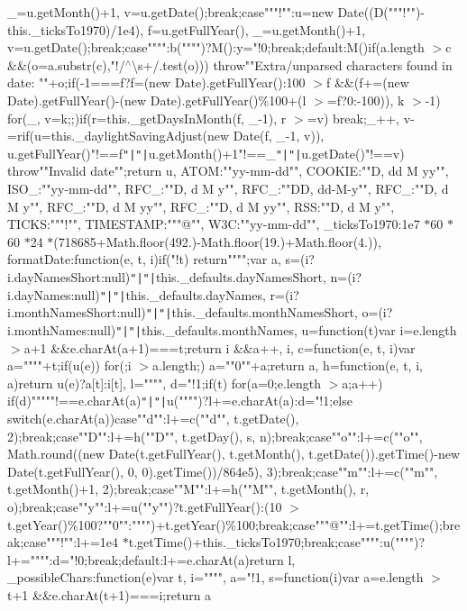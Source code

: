 \+\_\+=u.\+get\+Month()+1, v=u.\+get\+Date();break;case"""!""\+:u=new Date((\+D("""!"")-\/this.\+\_\+ticks\+To1970)/1e4), f=u.\+get\+Full\+Year(), \+\_\+=u.\+get\+Month()+1, v=u.\+get\+Date();break;case""\textquotesingle{}""\+:b(""\textquotesingle{}"")?\+M()\+:y="!0;break;default\+:\+M()\rcurly{}if(a.\+length $>$c \&\&(o=a.\+substr(c),"!/$^\wedge$\textbackslash{}s+/.\+test(o))) throw""Extra/unparsed characters found in date\+: ""+o;if(-\/1===f?f=(new Date).\+get\+Full\+Year()\+:100 $>$f \&\&(f+=(new Date).\+get\+Full\+Year()-\/(new Date).\+get\+Full\+Year()\%100+(l $>$=f?0\+:-\/100)), k $>$-\/1) for(\+\_, v=k;;)\lcurly{}if(r=this.\+\_\+get\+Days\+In\+Month(f, \+\_\+-\/1), r $>$=v) break;\+\_\+++, v-\/=r\rcurly{}if(u=this.\+\_\+daylight\+Saving\+Adjust(new Date(f, \+\_\+-\/1, v)), u.\+get\+Full\+Year()"!==f\texttt{"|}\texttt{"|}u.\+get\+Month()+1"!==\+\_\+\texttt{"|}\texttt{"|}u.\+get\+Date()"!==v) throw""Invalid date"";return u\rcurly{}, A\+T\+O\+M\+:""yy-\/mm-\/dd"", C\+O\+O\+K\+I\+E\+:""D, dd M yy"", I\+S\+O\+\_\+:""yy-\/mm-\/dd"", R\+F\+C\+\_\+:""D, d M y"", R\+F\+C\+\_\+:""D\+D, dd-\/\+M-\/y"", R\+F\+C\+\_\+:""D, d M y"", R\+F\+C\+\_\+:""D, d M yy"", R\+F\+C\+\_\+:""D, d M yy"", R\+S\+S\+:""D, d M y"", T\+I\+C\+K\+S\+:"""!"", T\+I\+M\+E\+S\+T\+A\+M\+P\+:"""@"", W3\+C\+:""yy-\/mm-\/dd"", \+\_\+ticks\+To1970\+:1e7 $\ast$60 $\ast$60 $\ast$24 $\ast$(718685+\+Math.\+floor(492.)-\/\+Math.\+floor(19.)+\+Math.\+floor(4.)), format\+Date\+:function(e, t, i)\lcurly{}if("!t) return"""";var a, s=(i?i.\+day\+Names\+Short\+:null)\texttt{"|}\texttt{"|}this.\+\_\+defaults.\+day\+Names\+Short, n=(i?i.\+day\+Names\+:null)\texttt{"|}\texttt{"|}this.\+\_\+defaults.\+day\+Names, r=(i?i.\+month\+Names\+Short\+:null)\texttt{"|}\texttt{"|}this.\+\_\+defaults.\+month\+Names\+Short, o=(i?i.\+month\+Names\+:null)\texttt{"|}\texttt{"|}this.\+\_\+defaults.\+month\+Names, u=function(t)\lcurly{}var i=e.\+length $>$a+1 \&\&e.\+char\+At(a+1)===t;return i \&\&a++, i\rcurly{}, c=function(e, t, i)\lcurly{}var a=""""+t;if(u(e)) for(;i $>$a.\+length;) a=""0""+a;return a\rcurly{}, h=function(e, t, i, a)\lcurly{}return u(e)?a[t]\+:i[t]\rcurly{}, l="""", d="!1;if(t) for(a=0;e.\+length $>$a;a++) if(d)""\textquotesingle{}"""!==e.\+char\+At(a)\texttt{"|}\texttt{"|}u(""\textquotesingle{}"")?l+=e.\+char\+At(a)\+:d="!1;else switch(e.\+char\+At(a))\lcurly{}case""d""\+:l+=c(""d"", t.\+get\+Date(), 2);break;case""D""\+:l+=h(""D"", t.\+get\+Day(), s, n);break;case""o""\+:l+=c(""o"", Math.\+round((new Date(t.\+get\+Full\+Year(), t.\+get\+Month(), t.\+get\+Date()).\+get\+Time()-\/new Date(t.\+get\+Full\+Year(), 0, 0).\+get\+Time())/864e5), 3);break;case""m""\+:l+=c(""m"", t.\+get\+Month()+1, 2);break;case""M""\+:l+=h(""M"", t.\+get\+Month(), r, o);break;case""y""\+:l+=u(""y"")?t.\+get\+Full\+Year()\+:(10 $>$t.\+get\+Year()\%100?""0""\+:"""")+t.\+get\+Year()\%100;break;case"""@""\+:l+=t.\+get\+Time();break;case"""!""\+:l+=1e4 $\ast$t.\+get\+Time()+this.\+\_\+ticks\+To1970;break;case""\textquotesingle{}""\+:u(""\textquotesingle{}"")?l+=""\textquotesingle{}""\+:d="!0;break;default\+:l+=e.\+char\+At(a)\rcurly{}return l\rcurly{}, \+\_\+possible\+Chars\+:function(e)\lcurly{}var t, i="""", a="!1, s=function(i)\lcurly{}var a=e.\+length $>$t+1 \&\&e.\+char\+At(t+1)===i;return a 